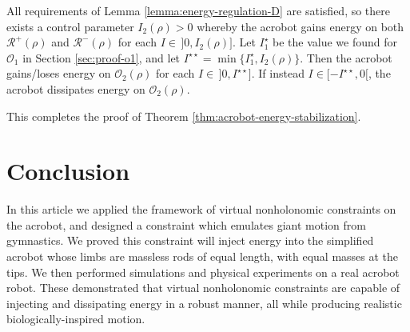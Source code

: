 \documentclass[journal,twoside,web, twocolumn,draftcls]{ieeecolor}
\begin{document}
All requirements of Lemma \ref{lemma:energy-regulation-D} are satisfied,
so there exists a control parameter \(I_2(\rho) > 0\) whereby the acrobot
gains energy on both \(\mathcal{R}^+(\rho)\) and \(\mathcal{R}^-(\rho)\) for
each \(I \in \, ]0,I_2(\rho)]\).
Let \(I_1^\star\) be the value we found for \(\mathcal{O}_1\) in 
Section \ref{sec:proof-o1}, and let
\(I^{\star\star} = \min \{I_1^\star, I_2(\rho)\}\).
Then the acrobot gains/loses energy on \(\mathcal{O}_2(\rho)\)
for each \(I \in \,]0, I^{\star\star}]\).
If instead \(I \in [-I^{\star\star},0[\), the acrobot dissipates energy on
\(\mathcal{O}_2(\rho)\).

This completes the proof of Theorem \ref{thm:acrobot-energy-stabilization}.

\section{Conclusion}\label{sec:conclusion}

In this article we applied the framework of virtual nonholonomic constraints
on the acrobot, and designed a constraint which emulates giant motion from
gymnastics.
We proved this constraint will inject energy into the simplified acrobot whose
limbs are massless rods of equal length, with equal masses at the tips.
We then performed simulations and physical experiments on a real acrobot robot.
These demonstrated that virtual nonholonomic constraints are capable of
injecting and dissipating energy in a robust manner, all while producing
realistic biologically-inspired motion.


\end{document}
